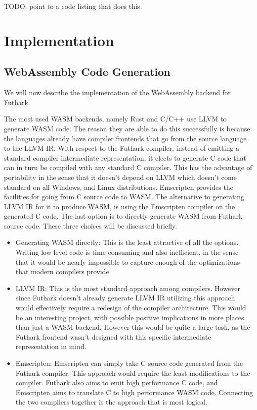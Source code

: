 \documentclass[11pt]{book}
\begin{document}
TODO: point to a code listing that does this.


\chapter{Implementation}

\section{WebAssembly Code Generation}

We will now describe the implementation of the WebAssembly backend for Futhark.

The most used WASM backends, namely Rust and C/C++ use LLVM to generate WASM code. The reason they are able to do this successfully is because the languages already have compiler frontends that go from the source language to the LLVM IR. With respect to the Futhark compiler, instead of emitting a standard compiler intermediate representation, it elects to generate C code that can in turn be compiled with any standard C compiler. This has the advantage of portability in the sense that it doesn't depend on LLVM which doesn't come standard on all Windows, and Linux distributions. 
Emscripten provides the facilities for going from C source code to WASM. The alternative to generating LLVM IR for it to produce WASM, is using the Emscripten compiler on the generated C code. The last option is to directly generate WASM from Futhark source code. These three choices will be discussed briefly.

\begin{itemize}
    \item Generating WASM directly: 
        This is the least attractive of all the options. Writing low level code is time consuming and also inefficient, in the sense that it would be nearly impossible to capture enough of the optimizations that modern compilers provide.
    \item LLVM IR: This is the most standard approach among compilers. However since Futhark doesn't already generate LLVM IR utilizing this approach would effectively require a redesign of the compiler architecture. This would be an interesting project, with possible positive implications in more places than just a WASM backend. However this would be quite a large task, as the Futhark frontend wasn't designed with this specific intermediate representation in mind. 
    \item Emscripten: Emscripten can simply take C source code generated from the Futhark compiler. This approach would require the least modifications to the compiler. Futhark also aims to emit high performance C code, and Emscripten aims to translate C to high performance WASM code. Connecting the two compilers together is the approach that is most logical.
\end{itemize}
\end{document}
